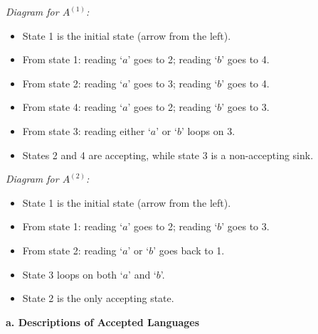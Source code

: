 \documentclass{article}
\theoremstyle{theorem}
\theoremstyle{definition}
\theoremstyle{remark}
\begin{document}
\noindent
\textit{Diagram for \(A^{(1)}\):}
\begin{itemize}
  \item State 1 is the initial state (arrow from the left).
  \item From state 1: reading `\(a\)' goes to 2; reading `\(b\)' goes to 4.
  \item From state 2: reading `\(a\)' goes to 3; reading `\(b\)' goes to 4.
  \item From state 4: reading `\(a\)' goes to 2; reading `\(b\)' goes to 3.
  \item From state 3: reading either `\(a\)' or `\(b\)' loops on 3.
  \item States 2 and 4 are accepting, while state 3 is a non-accepting sink.
\end{itemize}

\bigskip

\begin{center}
\end{center}

\noindent
\textit{Diagram for \(A^{(2)}\):}
\begin{itemize}
  \item State 1 is the initial state (arrow from the left).
  \item From state 1: reading `\(a\)' goes to 2; reading `\(b\)' goes to 3.
  \item From state 2: reading `\(a\)' or `\(b\)' goes back to 1.
  \item State 3 loops on both `\(a\)' and `\(b\)'.
  \item State 2 is the only accepting state.
\end{itemize}

\textbf{a. Descriptions of Accepted Languages}
\end{document}
